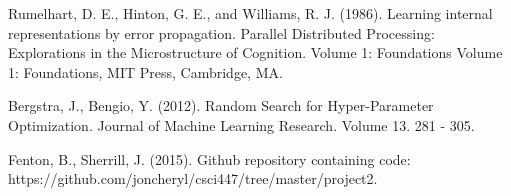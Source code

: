 \documentclass[conference]{IEEEtran}
\begin{document}
\begin{thebibliography}{1}

  Rumelhart, D. E., Hinton, G. E., and Williams, R. J. (1986). Learning internal representations by error propagation. Parallel Distributed Processing: Explorations in the Microstructure of Cognition. Volume 1: Foundations Volume 1: Foundations, MIT Press, Cambridge, MA.

  Bergstra, J., Bengio, Y. (2012). Random Search for Hyper-Parameter Optimization. Journal of Machine Learning Research. Volume 13. 281 - 305.

  Fenton, B., Sherrill, J. (2015). Github repository containing code: https://github.com/joncheryl/csci447/tree/master/project2.

\end{thebibliography}
\end{document}
